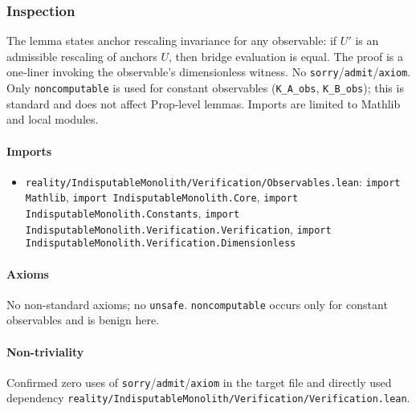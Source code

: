\documentclass{article}
\newcommand{\FileRef}[1]{\texttt{#1}}
\begin{document}
\subsubsection{Inspection}
The lemma states anchor rescaling invariance for any observable: if \(U'\) is an admissible rescaling of anchors \(U\), then bridge evaluation is equal. The proof is a one‑liner invoking the observable's dimensionless witness. No \texttt{sorry}/\texttt{admit}/\texttt{axiom}. Only \texttt{noncomputable} is used for constant observables (\texttt{K\_A\_obs}, \texttt{K\_B\_obs}); this is standard and does not affect Prop‑level lemmas. Imports are limited to Mathlib and local modules.

\paragraph{Imports}
\begin{itemize}[leftmargin=*]
  \item \FileRef{reality/IndisputableMonolith/Verification/Observables.lean}: \texttt{import Mathlib}, \texttt{import IndisputableMonolith.Core}, \texttt{import IndisputableMonolith.Constants}, \texttt{import IndisputableMonolith.Verification.Verification}, \texttt{import IndisputableMonolith.Verification.Dimensionless}
\end{itemize}

\paragraph{Axioms}
No non-standard axioms; no \texttt{unsafe}. \texttt{noncomputable} occurs only for constant observables and is benign here.

\paragraph{Non-triviality}
Confirmed zero uses of \texttt{sorry}/\texttt{admit}/\texttt{axiom} in the target file and directly used dependency \FileRef{reality/IndisputableMonolith/Verification/Verification.lean}.
\end{document}
